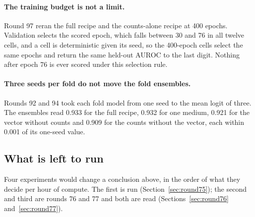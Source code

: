 \paragraph{The training budget is not a limit.} Round 97 reran the full recipe and the
counts-alone recipe at 400 epochs. Validation selects the scored epoch, which falls
between 30 and 76 in all twelve cells, and a cell is deterministic given its seed, so the
400-epoch cells select the same epochs and return the same held-out AUROC to the last
digit. Nothing after epoch 76 is ever scored under this selection rule.

\paragraph{Three seeds per fold do not move the fold ensembles.} Rounds 92 and 94 took
each fold model from one seed to the mean logit of three. The ensembles read 0.933 for
the full recipe, 0.932 for one medium, 0.921 for the vector without counts and 0.909 for
the counts without the vector, each within 0.001 of its one-seed value.




\subsection{What is left to run}
\label{sec:left-to-run}

Four experiments would change a conclusion above, in the order of what they decide per
hour of compute. The first is run (Section~\ref{sec:round75}); the second and third are
rounds 76 and 77 and both are read (Sections~\ref{sec:round76}
and~\ref{sec:round77}).

